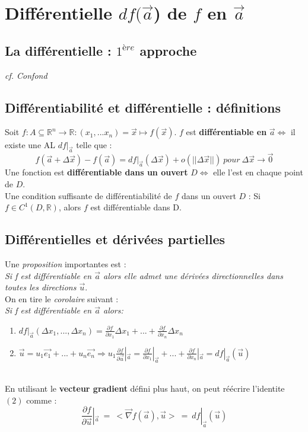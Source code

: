 \documentclass[11pt, a4paper, openany]{book}
\begin{document}
\section{Différentielle $df(\vec{a}$) de $f$ en $\vec{a}$}
\subsection{La différentielle : $1^{ère}$ approche}
\textit{cf. Confond}

\subsection{Différentiabilité et différentielle : définitions}
Soit $f : A \subseteq \mathbb{R}^n \rightarrow \mathbb{R} : (x_1, ... x_n) = \vec{x} \mapsto f(\vec{x})$. $f$ est \textbf{différentiable en} $\vec{a} \Leftrightarrow$ il existe une AL $df|_{\vec{a}}$ telle que :
$$f(\vec{a} + \Delta\vec{x}) - f(\vec{a}) = df|_{\vec{a}}(\Delta\vec{x}) + o(||\Delta\vec{x}||)\ pour\ \Delta\vec{x} \rightarrow \vec{0}$$
Une fonction est \textbf{différentiable dans un ouvert} $D \Leftrightarrow$ elle l'est en chaque point de $D$.\\

Une condition suffisante de différentiabilité de $f$ dans un ouvert $D$ : Si $f \in C^1(D, \mathbb{R})$, alors $f$ est différentiable dans D.

\subsection{Différentielles et dérivées partielles}
Une \textit{proposition} importantes est :\\
\textit{Si f est différentiable en $\vec{a}$ alors elle admet une dérivées directionnelles dans toutes les directions $\vec{u}$}.\\

On en tire le \textit{corolaire} suivant :\\
\textit{Si f est différentiable en $\vec{a}$ alors:}
\begin{enumerate}
	\item $df|_{\vec{a}}(\Delta x_1, ..., \Delta x_n) = \frac{\partial f}{\partial x_1} \Delta x_1 + ... + \frac{\partial f}{\partial x_n} \Delta x_n$
	\item $\vec{u} = u_1\vec{e_1} + ... + u_n\vec{e_n} \Rightarrow u_1 \frac{\partial f}{\partial \vec{u}}|_{\vec{a}} = \frac{\partial f}{\partial x_1}|_{\vec{a}} + ... + \frac{\partial f}{\partial x_n}|_{\vec{a}} = df|_{\vec{a}}(\vec{u})$
\end{enumerate}\ \\
En utilisant le \textbf{vecteur gradient} défini plus haut, on peut réécrire l'identite $(2)$ comme :
$$\frac{\partial f}{\partial\vec{u}}|_{\vec{a}}\ =\ <\vec{\nabla}f(\vec{a}), \vec{u}>\ =\ df|_{\vec{a}}(\vec{u})$$
\end{document}
